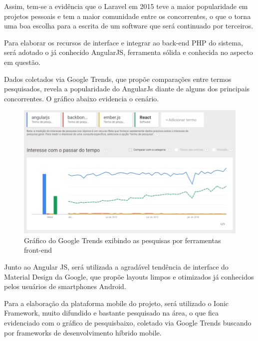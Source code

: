 Assim, tem-se a evidência que o Laravel em 2015 teve a maior popularidade em projetos pessoais e tem a maior comunidade entre os concorrentes, o que o torna uma boa escolha para a escrita de um software que será continuado por terceiros.


Para elaborar os recursos de interface e integrar ao back-end PHP do sistema, será adotado o já conhecido AngularJS, ferramenta sólida e conhecida no aspecto em questão. 


Dados coletados via Google Trends, que propõe comparações entre termos pesquisados, revela a popularidade do AngularJs diante de alguns dos principais concorrentes. O gráfico abaixo evidencia o cenário.


\begin{figure}
	\label{fig:graficoGoogleTrendsFerramentasFront}
	\includegraphics[width=1\textwidth]{img/grafico_ferramentas_front}
	\caption{Gráfico do Google Trends exibindo as pesquisas por ferramentas front-end}
\end{figure}


Junto ao Angular JS, será utilizada a agradável tendência de interface do Material Design da Google, que propõe layouts limpos e otimizados já conhecidos pelos usuários de smartphones Android. 


Para a elaboração da plataforma mobile do projeto, será utilizado o Ionic Framework, muito difundido e bastante pesquisado na área, o que fica evidenciado com o gráfico de pesquisbaixo, coletado via Google Trends buscando por frameworks de desenvolvimento híbrido mobile.


